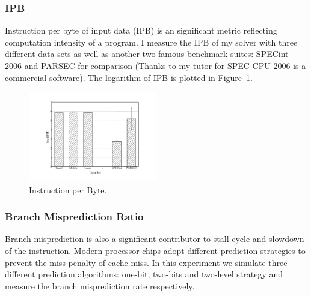 \subsubsection{IPB}
Instruction per byte of input data (IPB) is an significant metric reflecting computation intensity of a program. I measure the IPB of my solver with three different data sets as well as another two famous benchmark suites: SPECint 2006 and PARSEC for comparison (Thanks to my tutor for SPEC CPU 2006 is a commercial software). The logarithm of IPB is plotted in Figure~\ref{fig:IPB}. 

\begin{figure}
\centering
\includegraphics[width=0.50\textwidth]{graph/IPB.pdf}
\caption{Instruction per Byte.}
\label{fig:IPB}
\end{figure}

\subsubsection{Branch Misprediction Ratio }
Branch misprediction is also a significant contributor to stall cycle and slowdown of the instruction. Modern processor chips adopt different prediction strategies to prevent the miss penalty of cache miss. In this experiment we simulate three different prediction algorithms: one-bit, two-bits and two-level strategy and measure the branch misprediction rate respectively.

